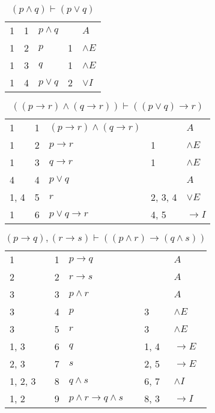 \documentclass{article}
\begin{document}
\begin{table}[htbp]\caption*{$(p∧q) ⊢ (p∨q)$}\centering\begin{tabular}{lrlll}
{1} & 1 & $p∧q$ & {} & $A$ \\
{1} & 2 & $p$ & {1} & $∧E$ \\
{1} & 3 & $q$ & {1} & $∧E$ \\
{1} & 4 & $p∨q$ & {2} & $∨I$ \\
\end{tabular}
\end{table}
\begin{table}[htbp]\caption*{$((p→r)∧(q→r)) ⊢ ((p∨q)→r)$}\centering\begin{tabular}{lrlll}
{1} & 1 & $(p→r)∧(q→r)$ & {} & $A$ \\
{1} & 2 & $p→r$ & {1} & $∧E$ \\
{1} & 3 & $q→r$ & {1} & $∧E$ \\
{4} & 4 & $p∨q$ & {} & $A$ \\
{1, 4} & 5 & $r$ & {2, 3, 4} & $∨E$ \\
{1} & 6 & $p∨q→r$ & {4, 5} & $→I$ \\
\end{tabular}
\end{table}
\begin{table}[htbp]\caption*{$(p→q),(r→s) ⊢ ((p∧r)→(q∧s))$}\centering\begin{tabular}{lrlll}
{1} & 1 & $p→q$ & {} & $A$ \\
{2} & 2 & $r→s$ & {} & $A$ \\
{3} & 3 & $p∧r$ & {} & $A$ \\
{3} & 4 & $p$ & {3} & $∧E$ \\
{3} & 5 & $r$ & {3} & $∧E$ \\
{1, 3} & 6 & $q$ & {1, 4} & $→E$ \\
{2, 3} & 7 & $s$ & {2, 5} & $→E$ \\
{1, 2, 3} & 8 & $q∧s$ & {6, 7} & $∧I$ \\
{1, 2} & 9 & $p∧r→q∧s$ & {8, 3} & $→I$ \\
\end{tabular}
\end{table}
\end{document}
